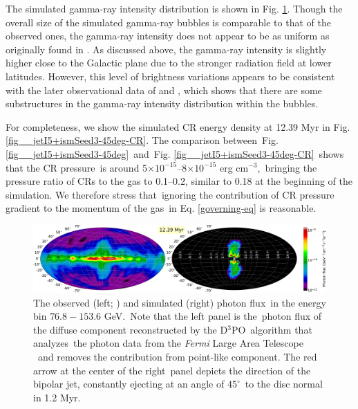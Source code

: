 \documentclass[fleqn,usenatbib,useAMS]{mnras}
\begin{document}
 The simulated gamma-ray intensity
 distribution is shown in Fig. \ref{fig__gammaRay-map}. Though the overall size of the simulated gamma-ray bubbles is comparable to that of the observed ones, the gamma-ray intensity does not appear to be
 as uniform as originally found in \citet{Su2012}.
 As discussed above, the gamma-ray intensity is slightly
 higher close to the Galactic plane due to the stronger
 radiation field at lower latitudes. However, this level
 of brightness variations appears to be consistent with the later
 observational data of \citet{Ackermann2014} and \citet{Selig2015}, which shows that there are some substructures in the gamma-ray intensity distribution within the bubbles.

 For completeness, we show the simulated CR energy density at 12.39 Myr in Fig. \ref{fig__jetI5+ismSeed3-45deg-CR}. The comparison between\
 Fig. \ref{fig__jetI5+ismSeed3-45deg}\
 and\
 Fig. \ref{fig__jetI5+ismSeed3-45deg-CR}\
 shows that the CR pressure\
 is around 5$\times10^{-15}$--8$\times10^{-15}$ erg cm$^{-3}$,\
 bringing the pressure ratio of CRs to the gas to 0.1--0.2,
 similar to 0.18 at the beginning of the simulation.
 We therefore stress that\
 ignoring the contribution of CR pressure gradient to the momentum of the gas\
 in Eq. \ref{governing-eq} is reasonable.




\begin{figure}
  \includegraphics[width=\linewidth]{figures/fig__GammaRay_100e9_1e6_angle_000.png}
  \caption{The observed (left; \citealt{Selig2015}) and simulated (right) photon flux\
           in the energy bin $76.8-153.6$ GeV.\
           Note that the left panel is the\
           photon flux of the diffuse component reconstructed by the D$^3$PO\
           algorithm \citep{Selig2015} that analyzes\
           the photon data from the \textit{Fermi} Large Area Telescope \citep{Atwood2009}\
           and removes the contribution from point-like component.
           The red arrow at the center of the right\
           panel depicts the direction of the bipolar jet, constantly ejecting at an angle of $45^{\circ}$\
           to the disc normal in 1.2 Myr.
  }
  \label{fig__gammaRay-map}
\end{figure}
\end{document}
